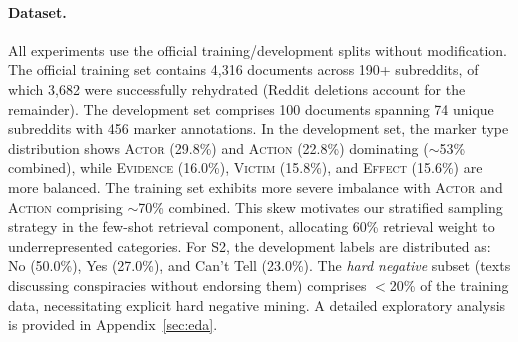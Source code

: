 \documentclass[11pt]{article}
\begin{document}
\paragraph{Dataset.}
All experiments use the official training/development splits without
modification. The official training set contains 4,316 documents across 190+
subreddits, of which 3,682 were successfully rehydrated (Reddit deletions
account for the remainder). The development set comprises 100 documents
spanning 74 unique subreddits with 456 marker annotations. In the development
set, the marker type distribution shows \textsc{Actor} (29.8\%) and
\textsc{Action} (22.8\%) dominating ($\sim$53\% combined), while
\textsc{Evidence} (16.0\%), \textsc{Victim} (15.8\%), and \textsc{Effect}
(15.6\%) are more balanced. The training set exhibits more severe imbalance
with \textsc{Actor} and \textsc{Action} comprising $\sim$70\% combined. This
skew motivates our stratified sampling strategy in the few-shot retrieval
component, allocating 60\% retrieval weight to underrepresented categories. For
S2, the development labels are distributed as: No (50.0\%), Yes (27.0\%), and
Can't Tell (23.0\%). The \textit{hard negative} subset (texts discussing
conspiracies without endorsing them) comprises $<$20\% of the training data,
necessitating explicit hard negative mining. A detailed exploratory analysis is
provided in Appendix~\ref{sec:eda}.
\end{document}
